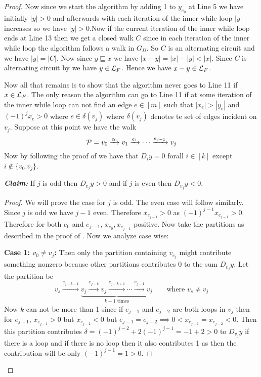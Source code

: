 \begin{proof}
	Now since we start the algorithm by adding 1 to $y_{e_0}$ at Line 5 we have initially $|y|>0$ and afterwards with each iteration of the inner while loop $|y|$ increases so we have $|y|>0$.Now if the current iteration of the inner while loop ends at Line 13 then we get a closed walk $C$ since in each iteration of the inner while loop the algorithm follows a walk in $G_D$. So $C$ is an alternating circuit and  we have $|y|=|C|$. Now since $y\sqsubseteq x$ we have $|x-y|=|x|-|y|<|x|$. Since $C$ is alternating circuit by  we have $y\in \mathcal{L}_F$. Hence we have $x-y\in\mathcal{L}_F$.

	Now all that remains is to show that the algorithm never goes to Line 11 if $x\in\mathcal{L}_F$. The only reason the algorithm can go to Line 11 if at some iteration of the inner while loop can not find an edge $e\in [m]$ such that $|x_e|>|y_e|$ and $(-1)^jx_e>0$ where $e\in \delta(v_j)$ where $\delta(v_j)$ denotes te set of edges incident on $v_j$. Suppose at this point we have the walk $$\mathcal{P}=v_0\xrightarrow{e_0}v_1\xrightarrow{e_1}\cdots \xrightarrow{e_{j-1}}v_j$$Now by following the proof of  we have that $D_iy=0$ forall $i\in[k]$ except $i\notin \{v_0.v_j\}$.\parinf \vspace*{5mm}

	\textbf{\textit{Claim:}} If $j$ is odd then $D_{v_j}y>0$ and if $j$ is even then $D_{v_j}y<0$.

	\begin{proof} We will prove the case for $j$ is odd. The even case will follow similarly. Since $j$ is odd we have $j-1$ even. Therefore $x_{e_{j-1}}>0$ as $(-1)^{j-1}x_{e_{j-1}}>0$. Therefore for both $e_0$ and $e_{j-1}$, $x_{e_0},x_{e_{j-1}}$ positive. Now take the partitions as described in the proof of . Now we analyze case wise:\parinf

		\textbf{Case 1: $v_0\neq v_j$:} Then only the partition containing $v_{e_j}$ might contribute something nonzero because other partitions contributes 0 to the sum $D_{v_j}y$. Let the partition be $$v_s\xrightarrow{e_{j-k-1}}\underbrace{v_j \xrightarrow{e_{j-k}}v_j\xrightarrow{e_{j-k+1}}\cdots \xrightarrow{e_{j-1}}v_j}_{k+1\text{ times}}\qquad \text{where $v_s\neq v_{j}$}$$Now $k$ can not be more than 1 since if $e_{j-1}$ and $e_{j-2}$ are both loops in $v_j$ then for $e_{j-1}$, $x_{e_{j-1}}>0$ but $x_{e_{j-2}}<0$ but  $e_{j-1}=e_{j-2}\implies 0<x_{e_{j-1}}=x_{e_{j-2}}<0$. Then this partition contributes $\delta=(-1)^{j-2}+2(-1)^{j-1}=-1+2>0$ to $D_{v_j}y$ if there is a loop and if there is no loop then it also contributes 1 as then the contribution will be only $(-1)^{j-1}=1>0$.


\end{proof}
\end{proof}
